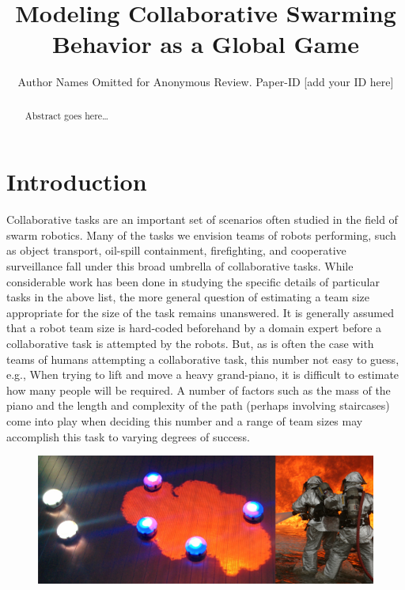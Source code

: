 \documentclass[conference]{IEEEtran}
\begin{document}
\title{Modeling Collaborative Swarming Behavior as a Global Game}
\author{Author Names Omitted for Anonymous Review. Paper-ID [add your ID here]}

\maketitle

\begin{abstract}
Abstract goes here\ldots
\end{abstract}

\IEEEpeerreviewmaketitle

\section{Introduction}\label{sec:intro}
Collaborative tasks are an important set of scenarios often studied in the field of swarm robotics. Many of the tasks we envision teams of robots performing, such as object transport, oil-spill containment, firefighting, and cooperative surveillance fall under this broad umbrella of collaborative tasks. While considerable work has been done in studying the specific details of particular tasks in the above list, the more general question of estimating a team size appropriate for the size of the task remains unanswered. It is generally assumed that a robot team size is hard-coded beforehand by a domain expert before a collaborative task is attempted by the robots. But, as is often the case with teams of humans attempting a collaborative task, this number not easy to guess, e.g., When trying to lift and move a heavy grand-piano, it is difficult to estimate how many people will be required. A number of factors such as the mass of the piano and the length and complexity of the path (perhaps involving staircases) come into play when deciding this number and a range of team sizes may accomplish this task to varying degrees of success.

\begin{figure}[!ht]
\centering\includegraphics[width=\textwidth]{../figures/dropletfire.png}
\centering\caption{}\label{fig:dropletfire}
\end{figure}
\end{document}
